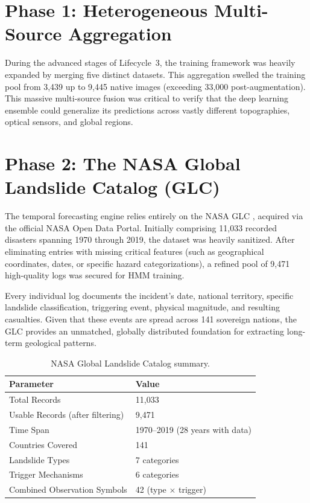 \documentclass[12pt,a4paper]{report}
\begin{document}
\section{Phase 1: Heterogeneous Multi-Source Aggregation}
During the advanced stages of Lifecycle~3, the training framework was heavily expanded by merging five distinct datasets. This aggregation swelled the training pool from 3,439 up to 9,445 native images (exceeding 33,000 post-augmentation). This massive multi-source fusion was critical to verify that the deep learning ensemble could generalize its predictions across vastly different topographies, optical sensors, and global regions.

\section{Phase 2: The NASA Global Landslide Catalog (GLC)}
The temporal forecasting engine relies entirely on the NASA GLC \cite{nasaglc2010}, acquired via the official NASA Open Data Portal. Initially comprising 11,033 recorded disasters spanning 1970 through 2019, the dataset was heavily sanitized. After eliminating entries with missing critical features (such as geographical coordinates, dates, or specific hazard categorizations), a refined pool of 9,471 high-quality logs was secured for HMM training.

Every individual log documents the incident's date, national territory, specific landslide classification, triggering event, physical magnitude, and resulting casualties. Given that these events are spread across 141 sovereign nations, the GLC provides an unmatched, globally distributed foundation for extracting long-term geological patterns.

\begin{table}[H]
\begin{center}
\caption{NASA Global Landslide Catalog summary.}\label{tab:nasaglc}
\begin{tabular}{ll}
\hline
{\bf Parameter} & {\bf Value} \\
\hline
Total Records & 11,033 \\
Usable Records (after filtering) & 9,471 \\
Time Span & 1970--2019 (28 years with data) \\
Countries Covered & 141 \\
Landslide Types & 7 categories \\
Trigger Mechanisms & 6 categories \\
Combined Observation Symbols & 42 (type $\times$ trigger) \\
\hline
\end{tabular}
\end{center}
\end{table}
\end{document}
